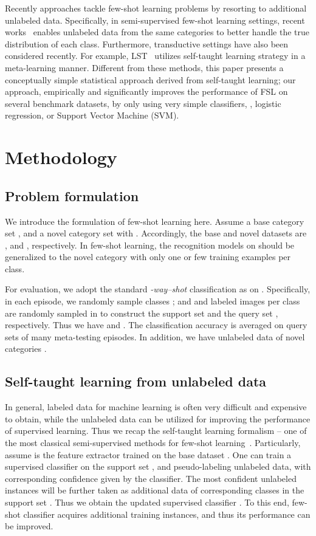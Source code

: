 \documentclass[10pt,letterpaper,twocolumn]{article}
\newcommand{\mypar}[1]{\smallskip\noindent {\bf #1}\enskip}
\begin{document}
\mypar{Few-shot learning with unlabeled data.}
Recently approaches  tackle few-shot learning problems by resorting to additional  unlabeled data. Specifically,  in semi-supervised few-shot learning settings, recent works~\cite{ren2018meta,liu2018learning} enables unlabeled data from the same categories to better handle the true distribution of each class. Furthermore, transductive settings have also been considered recently. For example,  LST~\cite{sun2019learning} utilizes self-taught learning strategy in a meta-learning manner. 
Different from these methods, this paper presents a conceptually simple statistical approach derived from self-taught learning; our approach, empirically and significantly improves the performance of FSL on several benchmark datasets, by only using very simple classifiers, \eg, logistic regression, or Support Vector Machine (SVM).
\section{Methodology}

\subsection{Problem formulation}

We introduce the formulation of few-shot learning here. Assume a base category
set , and a novel category set 
with . 
Accordingly, the base and novel datasets are ,
and ,
respectively. 
In few-shot learning, the recognition models on 
should be generalized to the novel category  with only one
or few training examples per class. 

For evaluation, we adopt the standard \emph{-way--shot} classification as \cite{vinyals2016matching} on . 
Specifically, in each episode, we randomly sample  classes ;
and  and  labeled images per class are randomly sampled in  to construct the support set  and the query set , respectively.
Thus we have  and .
The classification accuracy is averaged on query sets  of many
meta-testing episodes. In addition, we have unlabeled
data of novel categories . 

\subsection{Self-taught learning from unlabeled data}

In general, labeled data for machine learning is often very difficult
and expensive to obtain, while the unlabeled data can be utilized
for improving the performance of supervised learning. Thus we recap
the self-taught learning formalism -- one of the most classical semi-supervised
methods for few-shot learning~\cite{self-taught-learning}. Particularly,
assume  is the feature extractor trained
on the base dataset . One can train a supervised classifier
 on the support set , and pseudo-labeling unlabeled data, 
with corresponding confidence  given by the classifier. The most confident unlabeled
instances will be further taken as additional data of corresponding
classes in the support set . Thus we obtain the updated supervised
classifier . To this end, few-shot classifier
acquires additional training instances, and thus its performance can
be improved. 
\end{document}

